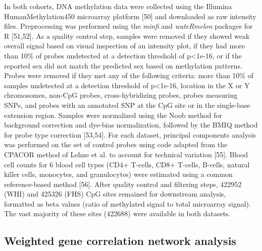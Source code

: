 \documentclass[]{article}
\theoremstyle{definition}
\theoremstyle{definition}
\theoremstyle{definition}
\theoremstyle{remark}
\begin{document}
In both cohorts, DNA methylation data were collected using the Illumina
HumanMethylation450 microarray platform {[}50{]} and downloaded as raw
intensity files. Preprocessing was performed using the \emph{minfi} and
\emph{wateRmelon} packages for R {[}51,52{]}. As a quality control step,
samples were removed if they showed weak overall signal based on visual
inspection of an intensity plot, if they had more than 10\% of probes
undetected at a detection threshold of p\textless{}1e-16, or if the
reported sex did not match the predicted sex based on methylation
patterns. Probes were removed if they met any of the following criteria:
more than 10\% of samples undetected at a detection threshold of
p\textless{}1e-16, location in the X or Y chromosomes, non-CpG probes,
cross-hybridizing probes, probes measuring SNPs, and probes with an
annotated SNP at the CpG site or in the single-base extension region.
Samples were normalized using the Noob method for background correction
and dye-bias normalization, followed by the BMIQ method for probe type
correction {[}53,54{]}. For each dataset, principal components analysis
was performed on the set of control probes using code adapted from the
CPACOR method of Lehne et al. to account for technical variation
{[}55{]}. Blood cell counts for 6 blood cell types (CD4+ T-cells, CD8+
T-cells, B-cells, natural killer cells, monocytes, and granulocytes)
were estimated using a common reference-based method {[}56{]}. After
quality control and filtering steps, 422952 (WHI) and 425326 (FHS) CpG
sites remained for downstream analysis, formatted as beta values (ratio
of methylated signal to total microarray signal). The vast majority of
these sites (422688) were available in both datasets.

\subsection{Weighted gene correlation network
analysis}\label{weighted-gene-correlation-network-analysis}
\end{document}
